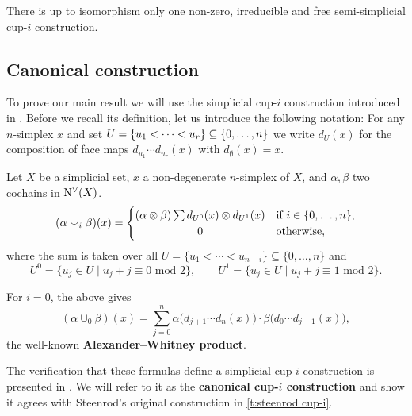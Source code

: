 \begin{theorem}
	There is up to isomorphism only one non-zero, irreducible and free semi-simplicial \mbox{cup-$i$} construction.
\end{theorem}

\subsection{Canonical construction}

To prove our main result we will use the simplicial \mbox{cup-$i$} construction introduced in \cite{medina2023fast_sq}.
Before we recall its definition, let us introduce the following notation:
For any $n$-simplex $x$ and set $U = \{u_1 < \dots < u_r\} \subseteq \set[big]{0,\dots,n}$ we write $d_U(x)$ for the composition of face maps $d_{u_1}\! \dotsm d_{u_r}(x)$ with $d_{\emptyset}(x) = x$.

\begin{definition}\label{d:my cup-i}
	Let $X$ be a simplicial set, $x$ a non-degenerate $n$-simplex of $X$, and $\alpha, \beta$ two cochains in $\operatorname{N^{\vee}}(X)$.
	\[
	(\alpha \cup_i \beta)(x) =
	\begin{cases}
		(\alpha \ot \beta) \sum d_{U^0}(x) \ot d_{U^1}(x) &
		\text{if } i \in \{0, \dots, n\}, \\
		\hfil 0 &
		\text{otherwise},
	\end{cases}
	\]
	where the sum is taken over all $U = \{u_1 < \cdots < u_{n-i}\} \subseteq \{0, \dots, n\}$ and
	\[
	U^0 = \{u_j \in U \mid u_j + j \equiv 0 \text{ mod } 2\}, \qquad
	U^1 = \{u_j \in U \mid u_j + j \equiv 1 \text{ mod } 2\}.
	\]
\end{definition}

\begin{example}
	For $i = 0$, the above gives
	\[
	(\alpha \cup_0 \beta)(x) =
	\sum_{j=0}^n \alpha \big(d_{j+1} \cdots d_{n}(x)\big) \cdot \beta \big(d_{0} \cdots d_{j-1}(x)\big),
	\]
	the well-known \textbf{Alexander--Whitney product}.
\end{example}

The verification that these formulas define a simplicial \mbox{cup-$i$} construction is presented in \cite{medina2023fast_sq}.
We will refer to it as the \textbf{canonical \mbox{cup-$i$} construction} and show it agrees with Steenrod's original construction in \cref{t:steenrod cup-i}.